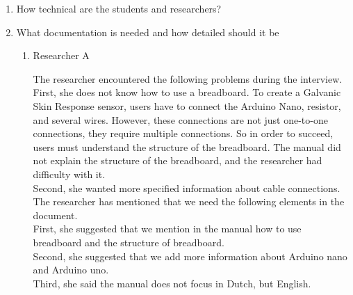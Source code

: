 \documentclass[conference]{IEEEtran}
\begin{document}
		\begin{enumerate}
			\item How technical are the students and researchers?
				\item What documentation is needed and how detailed should it be
				


				\begin{enumerate}
					\item Researcher A

						The researcher encountered the following problems during the interview.\\

						First, she does not know how to use a breadboard. To create a Galvanic Skin Response sensor, users have to connect the Arduino Nano, resistor, and several wires. However, these connections are not just one-to-one connections, they require multiple connections. So in order to succeed, users must understand the structure of the breadboard. The manual did not explain the structure of the breadboard, and the researcher had difficulty with it.\\
						Second, she wanted more specified information about cable connections.\\
						The researcher has mentioned that we need the following elements in the document.\\
						First, she suggested that we mention in the manual how to use breadboard and the structure of breadboard. \\
						Second, she suggested that we add more information about Arduino nano and Arduino uno.\\
						Third, she said the manual does not focus in Dutch, but English. \\		
						

\end{enumerate}
\end{enumerate}
\end{document}
